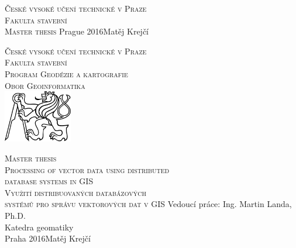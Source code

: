 \begin{center}
\newcommand{\napisCVUT}{České vysoké učení technické v Praze}
\newcommand{\napisFS}{Fakulta stavební}
\newcommand{\napisProgram}{Program Geodézie a kartografie}
\newcommand{\napisObor}{Obor Geoinformatika}
\newcommand{\napisKatedra}{Katedra geomatiky}
\newcommand{\napisVedouci}{Ing. Martin Landa, Ph.D.}
\newcommand{\napisAutor}{Matěj Krejčí}
\newcommand{\napisDatum}{Praha 2016}
\newcommand{\napisNazevI}{Processing of vector data using distributed}
\newcommand{\napisNazevII}{database systems in GIS}
\newcommand{\napisNazevAjI}{Využití distribuovaných databázových}
\newcommand{\napisNazevAjII}{ systémů pro správu vektorových dat v GIS}
\newcommand{\napisBakalarka}{Master thesis}
\newcommand{\napisPraha}{Prague 2016}
%
\newcommand{\velka}[1]{\textsc{#1}}
%
% 
\newif\ifpatitul
\patitultrue

\ifpatitul
{\Large\velka{\napisCVUT}}\\
\velka{\Large\napisFS}\\
\vfill
{\LARGE\velka{\napisBakalarka}}
\vfill
{\large\napisPraha\hfill\napisAutor}
\newpage
\fi%


{\Large\velka{\napisCVUT}}\\
{\Large\velka{\napisFS}}\\
{\Large\velka{\napisProgram}}\\
{\Large\velka{\napisObor}}\\
\vfill
\includegraphics[width=3cm]{logo_cvut_cb} %
\vfill

{\Large\velka{\napisBakalarka}}\\
{\Large\velka{\napisNazevI\\
\napisNazevII}}\\
{\large\velka{\napisNazevAjI\\
\napisNazevAjII}}
\vfill
{\large%
Vedoucí práce: \napisVedouci\\
\napisKatedra\\
\bigskip
\napisDatum\hfill\napisAutor}
\end{center}
